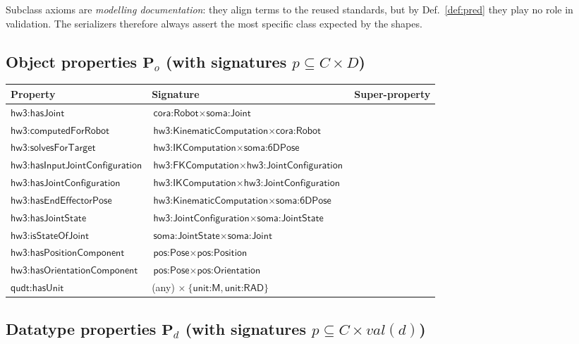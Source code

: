\documentclass[11pt,a4paper]{article}
\newcommand{\IRI}[1]{\textsf{#1}}                    %
\begin{document}
Subclass axioms are \emph{modelling documentation}: they align terms to the
reused standards, but by Def.~\ref{def:pred} they play
no role in validation. The serializers therefore always assert the most specific
class expected by the shapes.

\subsection{Object properties $\mathbf{P}_o$ (with signatures $p \subseteq C \times D$)}

\begin{center}\small
\begin{tabular}{@{}lll@{}}
\toprule
Property & Signature & Super-property \\
\midrule
$\IRI{hw3{:}hasJoint}$ & $\IRI{cora{:}Robot} \times \IRI{soma{:}Joint}$ & \\
$\IRI{hw3{:}computedForRobot}$ & $\IRI{hw3{:}KinematicComputation} \times \IRI{cora{:}Robot}$ & \\
$\IRI{hw3{:}solvesForTarget}$ & $\IRI{hw3{:}IKComputation} \times \IRI{soma{:}6DPose}$ & \\
$\IRI{hw3{:}hasInputJointConfiguration}$ & $\IRI{hw3{:}FKComputation} \times \IRI{hw3{:}JointConfiguration}$ & \\
$\IRI{hw3{:}hasJointConfiguration}$ & $\IRI{hw3{:}IKComputation} \times \IRI{hw3{:}JointConfiguration}$ & \\
$\IRI{hw3{:}hasEndEffectorPose}$ & $\IRI{hw3{:}KinematicComputation} \times \IRI{soma{:}6DPose}$ & \\
$\IRI{hw3{:}hasJointState}$ & $\IRI{hw3{:}JointConfiguration} \times \IRI{soma{:}JointState}$ & \\
$\IRI{hw3{:}isStateOfJoint}$ & $\IRI{soma{:}JointState} \times \IRI{soma{:}Joint}$ & \\
$\IRI{hw3{:}hasPositionComponent}$ & $\IRI{pos{:}Pose} \times \IRI{pos{:}Position}$ & \\
$\IRI{hw3{:}hasOrientationComponent}$ & $\IRI{pos{:}Pose} \times \IRI{pos{:}Orientation}$ & \\
$\IRI{qudt{:}hasUnit}$ & (any) $\times\ \{\IRI{unit{:}M}, \IRI{unit{:}RAD}\}$ & \\
\bottomrule
\end{tabular}
\end{center}

\subsection{Datatype properties $\mathbf{P}_d$ (with signatures $p \subseteq C \times \mathit{val}(d)$)}
\end{document}
